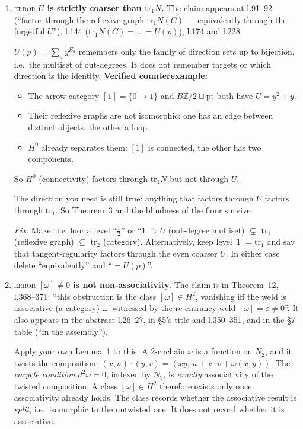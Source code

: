 \documentclass[11pt]{article}
\newcommand{\Z}{\mathbb{Z}}
\newcommand{\iss}[1]{\textsc{#1}}
\begin{document}
\begin{enumerate}[label=\textbf{N\arabic*},leftmargin=*]
\item \iss{error} \textbf{$U$ is strictly coarser than $\mathrm{tr}_1N$.} The claim appears at
l.91--92 (``factor through the reflexive graph $\mathrm{tr}_1N(C)$ --- equivalently through the
forgetful $U$''), l.144 ($\mathrm{tr}_1N(C)=\dots=U(p)$), l.174 and l.228.

$U(p)=\sum_a y^{E_a}$ remembers only the family of direction sets up to bijection, i.e.\ the
multiset of out-degrees. It does not remember targets or which direction is the identity.
\textbf{Verified counterexample:}
\begin{itemize}[leftmargin=1.2em]
\item The arrow category $[1]=\{0\to1\}$ and $B\Z/2\sqcup\mathrm{pt}$ both have
$U=y^2+y$.
\item Their reflexive graphs are not isomorphic: one has an edge between distinct objects, the
other a loop.
\item $H^0$ already separates them: $[1]$ is connected, the other has two components.
\end{itemize}
So $H^0$ (connectivity) factors through $\mathrm{tr}_1N$ but not through $U$.

The direction you need is still true: anything that factors through $U$ factors through
$\mathrm{tr}_1$. So Theorem~3 and the blindness of the floor survive.

\emph{Fix.} Make the floor a level ``$\tfrac12$'' or ``$1^-$'': $U$ (out-degree multiset)
$\subsetneq$ $\mathrm{tr}_1$ (reflexive graph) $\subsetneq$ $\mathrm{tr}_2$ (category).
Alternatively, keep level~1 $=\mathrm{tr}_1$ and say that tangent-regularity factors through the
even coarser $U$. In either case delete ``equivalently'' and ``$=U(p)$''.

\item \iss{error} \textbf{$[\omega]\neq0$ is not non-associativity.} The claim is in
Theorem~12, l.368--371: ``this obstruction is the class $[\omega]\in H^2$, vanishing iff the weld
is associative (a category) \dots\ witnessed by the re-entrancy weld $[\omega]=\varepsilon\neq0$''.
It also appears in the abstract l.26--27, in \S5's title and l.350--351, and in the \S7 table
(``in the assembly'').

Apply your own Lemma~1 to this. A 2-cochain $\omega$ is a function on $N_2$, and it twists the
composition: $(x,u)\cdot(y,v)=(xy,\,u+x\!\cdot\!v+\omega(x,y))$. The \emph{cocycle condition}
$d^2\omega=0$, indexed by $N_3$, is \emph{exactly} associativity of the twisted composition. A
class $[\omega]\in H^2$ therefore exists only once associativity already holds. The class records
whether the associative result is \emph{split}, i.e.\ isomorphic to the untwisted one. It does not
record whether it is associative.


\end{enumerate}
\end{document}

